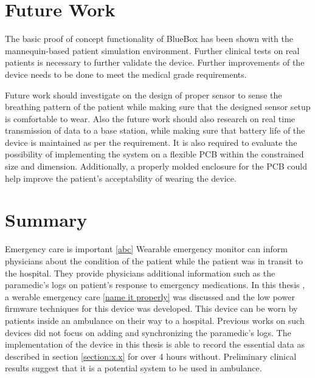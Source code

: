 \section{Future Work}
The basic proof of concept functionality of BlueBox has been shown with the  mannequin-based patient simulation environment. Further clinical tests on real patients is necessary to further validate the device. Further improvements of the  device needs to be done to meet the medical grade requirements.  

Future work should investigate on the design of proper sensor to sense the breathing pattern of the patient while making sure that the designed sensor setup is comfortable to wear. Also the future work should also research on real time transmission of data to a base station, while making sure that battery life of the device is maintained as per the requirement. It is also required to evaluate the possibility of implementing the system on a flexible PCB within the constrained size and dimension. Additionally, a properly molded enclosure for the PCB could help improve the patient's acceptability of wearing the device. 
\section{Summary}
Emergency care is important \ref{abc} 
Wearable emergency monitor can inform physicians about the condition of the patient while the patient was in transit to the hospital. They provide physicians additional information such as the paramedic's logs on patient's response to emergency medications. In this thesis , a werable emergency care \ref{name it properly} was discussed and the low power firmware techniques for this device was developed. This device can be worn by patients inside an ambulance on their way to a hospital. Previous works on such devices did not focus on adding and synchronizing the paramedic's logs. The implementation of the device in this thesis is able to record the essential data as described in section \ref{section:x.x} for over 4 hours without. Preliminary clinical results suggest that it is a potential system to be used in ambulance.